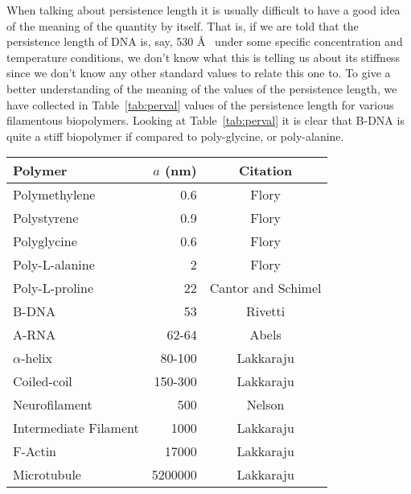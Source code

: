 When talking about persistence length  it is usually difficult to have
a good idea of  the meaning of the quantity by itself.  That is, if we
are told  that the persistence length  of DNA is, say,  530 \AA~ under
some specific concentration and  temperature conditions, we don't know
what this  is telling us about  its stiffness since we  don't know any
other  standard  values  to relate  this  one  to.  To give  a  better
understanding of the meaning of  the values of the persistence length,
we have collected in  Table~\ref{tab:perval} values of the persistence
length    for   various    filamentous   biopolymers.     Looking   at
Table~\ref{tab:perval}  it  is  clear  that  B-DNA is  quite  a  stiff
biopolymer if compared to poly-glycine, or poly-alanine.

\begin{table}[htbp]
\begin{center}
\begin{threeparttable}
\begin{tabular}{l|r|c}
\hline
Polymer               & $a$ (nm) & Citation  \\ \hline
Polymethylene         & 0.6      & Flory\tnote{a}      \\  
Polystyrene           & 0.9      & Flory\tnote{a}      \\
Polyglycine           & 0.6      & Flory \tnote{b}     \\
Poly-L-alanine        & 2        & Flory \tnote{b}     \\
Poly-L-proline        & 22       & Cantor and Schimel \cite{cantor1980} \\
B-DNA                 & 53       & Rivetti \cite{rivetti1996}     \\
A-RNA                 & 62-64    & Abels     \cite{abels2005}     \\
$\alpha$-helix        & 80-100   & Lakkaraju \cite{lakkaraju2009} \\
Coiled-coil           & 150-300  & Lakkaraju \cite{lakkaraju2009} \\
Neurofilament         & 500      & Nelson    \cite{nelson2004}    \\
Intermediate Filament & 1000     & Lakkaraju \cite{lakkaraju2009} \\
F-Actin               & 17000    & Lakkaraju \cite{lakkaraju2009} \\
Microtubule           & 5200000  & Lakkaraju \cite{lakkaraju2009} \\

\end{tabular}
\end{threeparttable}
\end{center}
\end{table}
